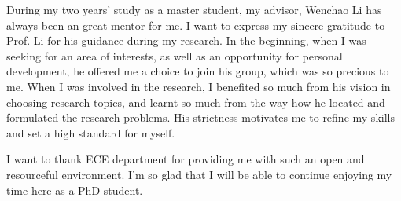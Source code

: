 During my two years' study as a master student, my advisor, Wenchao Li has always
been an great mentor for me. I want to express my sincere gratitude 
to Prof. Li for his guidance during my research. 
In the beginning, when I was seeking for an area of interests, as well as an 
opportunity for personal development, he offered me a choice to join his group, 
which was so precious to me.
When I was involved in the research, I benefited so much from his vision in 
choosing research topics, and learnt so much from the way how he located 
and formulated the research problems. His strictness motivates me to refine 
my skills and set a high standard for myself. 

I want to thank ECE department for providing me with such an open and resourceful environment. 
I'm so glad that I will be able to continue enjoying my time here as a PhD student.

\vskip 1in
